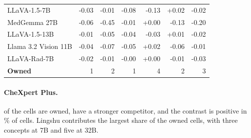 \documentclass{article}
\begin{document}
\begin{table}[htbp]
{\begin{tabular}{lrrrrrr}
LLaVA-1.5-7B & \cellcolor{cfSlate2}-0.03 & \cellcolor{cfSlate1}-0.01 & \cellcolor{cfSlate2}-0.08 & \cellcolor{cfSlate3}-0.13 & \cellcolor{cfTerra2}+0.02 & \cellcolor{cfSlate1}-0.02 \\
MedGemma 27B & \cellcolor{cfSlate2}-0.06 & \cellcolor{cfSlate4}-0.45 & \cellcolor{cfSlate1}-0.01 & \cellcolor{cfTerra1}+0.00 & \cellcolor{cfSlate3}-0.13 & \cellcolor{cfSlate3}-0.20 \\
LLaVA-1.5-13B & \cellcolor{cfSlate1}-0.01 & \cellcolor{cfSlate2}-0.05 & \cellcolor{cfSlate2}-0.04 & \cellcolor{cfSlate2}-0.03 & \cellcolor{cfTerra1}+0.01 & \cellcolor{cfSlate1}-0.02 \\
Llama 3.2 Vision 11B & \cellcolor{cfSlate2}-0.04 & \cellcolor{cfSlate2}-0.07 & \cellcolor{cfSlate2}-0.05 & \cellcolor{cfTerra2}+0.02 & \cellcolor{cfSlate2}-0.06 & \cellcolor{cfSlate1}-0.01 \\
LLaVA-Rad-7B & \cellcolor{cfSlate1}-0.02 & \cellcolor{cfSlate1}-0.01 & \cellcolor{cfSlate1}-0.00 & \cellcolor{cfTerra1}+0.00 & \cellcolor{cfSlate1}-0.01 & \cellcolor{cfSlate2}-0.03 \\
\midrule
\textbf{Owned} & 1 & 2 & 1 & 4 & 2 & 3 \\
\bottomrule
\end{tabular}}
\end{table}

\paragraph{CheXpert Plus.} \cfChexOwned{} of the \cfChexCells{} cells are owned, \cfChexCompetitor{} have a stronger competitor, and the contrast is positive in \cfGeoOwnWinsChexPct\% of cells. Lingshu contributes the largest share of the owned cells, with three concepts at 7B and five at 32B.
\end{document}
